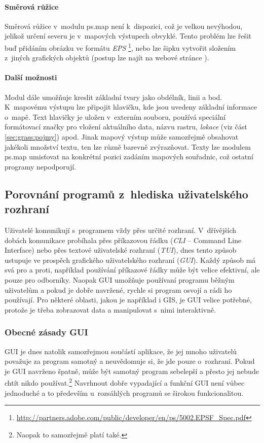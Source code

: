 \documentclass[a4paper,12pt,draft]{article}
\begin{document}
\paragraph*{Směrová růžice}
Směrová růžice v~modulu ps.map není k~dispozici, což je velkou
nevýhodou, jelikož určení severu je v~mapových výstupech obvyklé. Tento
problém lze řešit buď přidáním obrázku ve formátu \emph{EPS}%
\footnote{\url{http://partners.adobe.com/public/developer/en/ps/5002.EPSF_Spec.pdf}},
nebo lze šipku vytvořit složením z~jiných grafických objektů (postup lze
najít na webové stránce \cite{wiki_psmap_north}).

\paragraph*{Další možnosti}
Modul dále umožňuje kreslit základní tvary jako obdélník, linii a
bod. K~mapovému výstupu lze připojit hlavičku, kde jsou uvedeny základní
informace o~mapě. Text hlavičky je uložen v~externím souboru, používá
speciální formátovací značky pro vložení aktuálního data, názvu
rastru, \emph{lokace} (viz část \ref{sec:grass:pojmy}) apod.
Jinak  mapový výstup může samozřejmě obsahovat
jakékoli množství textu, ten lze různě barevně zvýrazňovat. Texty lze
modulem ps.map umisťovat na konkrétní pozici zadáním mapových
souřadnic, což ostatní programy nepodporují.




\subsection{Porovnání programů  z~hlediska uživatelského rozhraní}
Uživatelé komunikují s~programem vždy přes určité rozhraní.
V~dřívějších dobách komunikace probíhala přes příkazovou
řádku (\emph{CLI} -- Command Line Interface) nebo přes textové uživatelské
rozhraní (\emph{TUI}), dnes tento způsob ustupuje ve prospěch grafického
uživatelského
rozhraní (\emph{GUI}). Každý způsob má svá pro a proti, například
používání příkazové řádky může být velice efektivní, ale pouze
pro odborníky. Naopak GUI umožňuje používaní programu běžným
uživatelům a pokud je dobře navržené, rychle si program osvojí a
rádi ho používají. Pro některé oblasti, jakou je například i GIS,
je GUI velice potřebné, protože je třeba zobrazovat
data a manipulovat s~nimi interaktivně.

\subsubsection{Obecné zásady GUI}
\label{sec:GUI_zasady}
GUI je dnes natolik samozřejmou součástí aplikace, že jej mnoho
uživatelů považuje za program samotný a neuvědomuje si, že jde
pouze o~rozhraní. Pokud je GUI navrženo špatně,
může být samotný program sebelepší a přesto jej nebude chtít nikdo
používat.\footnote{Naopak to samozřejmě platí také.} Navrhnout dobře
vypadající a funkční GUI není vůbec jednoduché a to
především u~rozsáhlých programů se širokou funkcionalitou.
\end{document}
